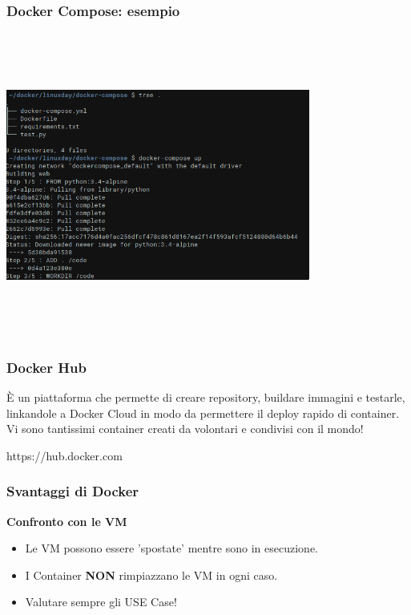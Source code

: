 \documentclass{beamer}
\begin{document}
\begin{frame} 
    \frametitle{Docker Compose: esempio}
    \begin{center}
        \includegraphics[width=10cm,height=10cm,keepaspectratio]{compose.png}
    \end{center}
\end{frame}


\begin{frame}
    \frametitle{Docker Hub}
    \`E un piattaforma che permette di creare repository, buildare immagini e testarle, linkandole a Docker Cloud in modo da permettere 
    il deploy rapido di container. Vi sono tantissimi container creati da volontari e condivisi con il mondo!
    \newline
    \begin{center}
        https://hub.docker.com
    \end{center}
\end{frame}


\begin{frame}
    \frametitle{Svantaggi di Docker}
    \begin{center}
        \textbf{Confronto con le VM}
    \end{center}
    \begin{itemize}
        \item<1-> Le VM possono essere 'spostate' mentre sono in esecuzione. 
        \item<2-> I Container \textbf{NON} rimpiazzano le VM in ogni caso.
        \item<3-> Valutare sempre gli USE Case!
    \end{itemize}
\end{frame}
\end{document}
